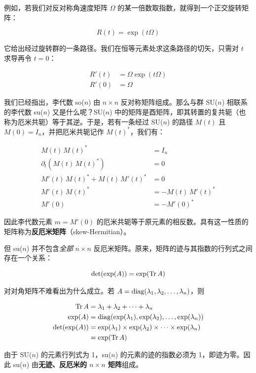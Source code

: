 例如，若我们对反对称角速度矩阵 $\Omega$ 的某一倍数取指数，就得到一个正交旋转矩阵：

\begin{equation}
R(t) = \exp(t\Omega)
\end{equation}

它给出经过旋转群的一条路径。我们在恒等元素处求这条路径的切矢，只需对 $t$ 求导再令 $t=0$：

\begin{align}
R'(t) &= \Omega\exp(t\Omega) \\
R'(0) &= \Omega
\end{align}

我们已经指出，李代数 so($n$) 由 $n\times n$ 反对称矩阵组成。那么与群 SU($n$) 相联系的李代数 su($n$) 又是什么呢？SU($n$) 中的矩阵是酉矩阵，即其转置的复共轭（也称为厄米共轭）等于其逆。于是，若有一条经过 SU($n$) 的路径 $M(t)$ 且 $M(0)=I_n$，并把厄米共轭记作 $M(t)^{*}$，我们有：

\begin{align}
M(t)\,M(t)^{*} &= I_n \\
\partial_t\!\left(M(t)\,M(t)^{*}\right) &= 0 \\
M'(t)\,M(t)^{*} + M(t)\,M'(t)^{*} &= 0 \\
M'(t)\,M(t)^{*} &= -M(t)\,M'(t)^{*} \\
M'(0) &= -M'(0)^{*}
\end{align}

因此李代数元素 $m=M'(0)$ 的厄米共轭等于原元素的相反数。具有这一性质的矩阵称为\textbf{反厄米矩阵}（skew-Hermitian）。

但 su($n$) 并不包含\emph{全部} $n\times n$ 反厄米矩阵。原来，矩阵的迹与其指数的行列式之间存在一个关系：

\begin{equation}
\det(\exp(A)) = \exp(\operatorname{Tr} A)
\end{equation}

对对角矩阵不难看出为什么成立。若 $A=\operatorname{diag}(\lambda_1,\lambda_2,\dots,\lambda_n)$，则

\begin{align}
\operatorname{Tr} A &= \lambda_1 + \lambda_2 + \dots + \lambda_n \\
\exp(A) &= \operatorname{diag}(\exp(\lambda_1),\exp(\lambda_2),\dots,\exp(\lambda_n)) \\
\det(\exp(A)) &= \exp(\lambda_1)\times\exp(\lambda_2)\times\dots\times\exp(\lambda_n) \\
&= \exp(\operatorname{Tr} A)
\end{align}

由于 SU($n$) 的元素行列式为 1，su($n$) 的元素的迹的指数必须为 1，即迹为零。因此 su($n$) 由\textbf{无迹、反厄米的 $n\times n$ 矩阵}组成。

